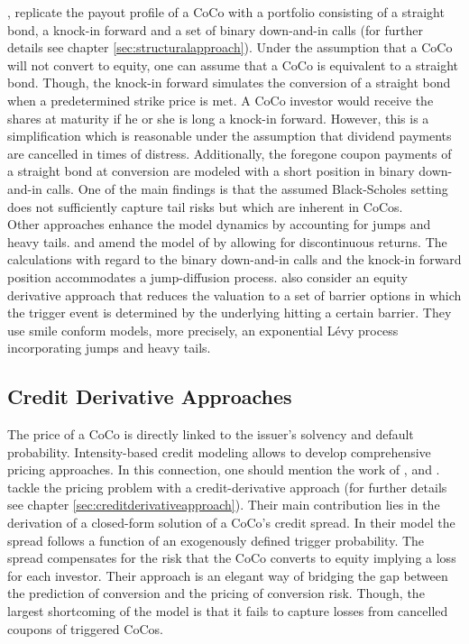 \citet{de2011pricing}, replicate the payout profile of a CoCo with a portfolio consisting of a straight bond, a knock-in forward and a set of binary down-and-in calls (for further details see chapter \ref{sec:structuralapproach}). Under the assumption that a CoCo will not convert to equity, one can assume that a CoCo is equivalent to a straight bond. Though, the knock-in forward simulates the conversion of a straight bond when a predetermined strike price is met. A CoCo investor would receive the shares at maturity if he or she is long a knock-in forward. However, this is a simplification which is reasonable under the assumption that dividend payments are cancelled in times of distress. Additionally, the foregone coupon payments of a straight bond at conversion are modeled with a short position in binary down-and-in calls. One of the main findings is that the assumed Black-Scholes setting does not sufficiently capture tail risks but which are inherent in CoCos.\\

Other approaches enhance the model dynamics by accounting for jumps and heavy tails. \citet{erismann2015pricing} and \citet{teneberg2012equity} amend the model of \citet{de2011pricing} by allowing for discontinuous returns. The calculations with regard to the binary down-and-in calls and the knock-in forward position accommodates a jump-diffusion process. \citet{corcuera2013pricing} also consider an equity derivative approach that reduces the valuation to a set of barrier options in which the trigger event is determined by the underlying hitting a certain barrier. They use smile conform models, more precisely, an exponential L\'{e}vy process incorporating jumps and heavy tails.

\subsection*{Credit Derivative Approaches}
The price of a CoCo is directly linked to the issuer's solvency and default probability. Intensity-based credit modeling allows to develop comprehensive pricing approaches. In this connection, one should mention the work of \citet{de2011pricing}, \citet{serjantov2011hybrid} and \citet{erismann2015pricing}. \\

\citet{de2011pricing} tackle the pricing problem with a credit-derivative approach (for further details see chapter \ref{sec:creditderivativeapproach}). Their main contribution lies in the derivation of a closed-form solution of a CoCo's credit spread. In their model the spread follows a function of an exogenously defined trigger probability. The spread compensates for the risk that the CoCo converts to equity implying a loss for each investor. Their approach is an elegant way of bridging the gap between the prediction of conversion and the pricing of conversion risk. Though, the largest shortcoming of the model is that it fails to capture losses from cancelled coupons of triggered CoCos.\\


